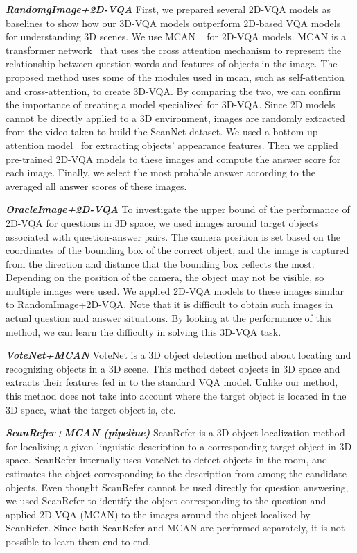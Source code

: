 \noindent \textit{\textbf{RandomgImage+2D-VQA}}
First, we prepared several 2D-VQA models as baselines to show how our 3D-VQA models outperform 2D-based VQA models for understanding 3D scenes. 
We use {MCAN} ~\cite{Yu_2019_CVPR} for 2D-VQA models.
MCAN is a transformer network~\cite{NIPS2017_3f5ee243} that uses the cross attention mechanism to represent the relationship between question words and features of objects in the image. 
The proposed method uses some of the modules used in mcan, such as self-attention and cross-attention, to create 3D-VQA. By comparing the two, we can confirm the importance of creating a model specialized for 3D-VQA.
Since 2D models cannot be directly applied to a 3D environment, images are randomly extracted from the video taken to build the ScanNet dataset. We used a bottom-up attention model~\cite{Anderson_2018_CVPR} for extracting objects' appearance features. Then we applied pre-trained 2D-VQA models to these images and compute the answer score for each image. Finally, we select the most probable answer according to the averaged all answer scores of these images.


\noindent \textit{\textbf{OracleImage+2D-VQA}}
To investigate the upper bound of the performance of 2D-VQA for questions in 3D space, we used images around target objects associated with question-answer pairs. 
The camera position is set based on the coordinates of the bounding box of the correct object, and the image is captured from the direction and distance that the bounding box reflects the most. Depending on the position of the camera, the object may not be visible, so multiple images were used.
We applied 2D-VQA models to these images similar to RandomImage+2D-VQA.
Note that it is difficult to obtain such images in actual question and answer situations.
By looking at the performance of this method, we can learn the difficulty in solving this 3D-VQA task.

\noindent \textit{\textbf{VoteNet+MCAN}}
VoteNet is a 3D object detection method about locating and recognizing objects in a 3D scene.
This method detect objects in 3D space and extracts their features fed in to the standard VQA model.
Unlike our method,
this method does not take into account where the target object is located in the 3D space, what the target object is, etc.



\noindent \textit{\textbf{ScanRefer+MCAN (pipeline)}}
ScanRefer is a 3D object localization method for localizing a given linguistic description to a corresponding target object in 3D space.
ScanRefer internally uses VoteNet to detect objects in the room, and estimates the object corresponding to the description from among the candidate objects.
Even thought ScanRefer cannot be used directly for question answering, we used ScanRefer to identify the object corresponding to the question and applied 2D-VQA (MCAN) to the images around the object localized by ScanRefer.
Since both ScanRefer and MCAN are performed separately, it is not possible to learn them end-to-end.

